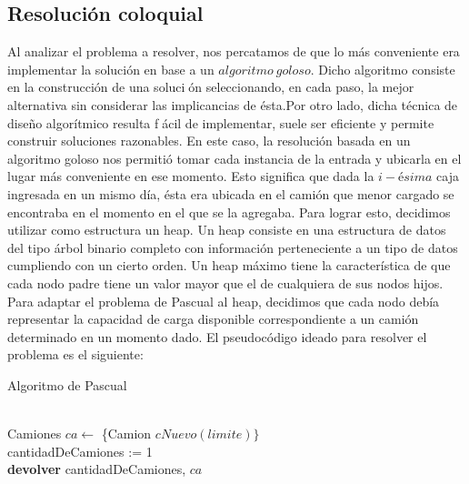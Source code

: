 \subsection{Resolución coloquial}
Al analizar el problema a resolver, nos percatamos de que lo más conveniente era implementar la solución en base a un $algoritmo\ goloso$. Dicho algoritmo consiste en la construcción de una solución seleccionando, en cada paso, la mejor alternativa sin considerar las implicancias de ésta.\newline Por otro lado, dicha técnica de diseño algorítmico resulta fácil de implementar, suele ser eficiente y permite construir soluciones razonables.\newline
\newline
En este caso, la resolución basada en un algoritmo goloso nos permitió tomar cada instancia de la entrada y ubicarla en el lugar más conveniente en ese momento. Esto significa que dada la $i-ésima$ caja ingresada en un mismo día, ésta era ubicada en el camión que menor cargado se encontraba en el momento en el que se la agregaba. Para lograr esto, decidimos utilizar como estructura un heap.\newline
\newline
Un heap consiste en una estructura de datos del tipo árbol binario completo con información perteneciente a un tipo de datos cumpliendo con un cierto orden. Un heap máximo tiene la característica de que cada nodo padre tiene un valor mayor que el de cualquiera de sus nodos hijos.\newline
Para adaptar el problema de Pascual al heap, decidimos que cada nodo debía representar la capacidad de carga disponible correspondiente a un camión determinado en un momento dado.\newline
\newline
El pseudocódigo ideado para resolver el problema es el siguiente:\newline

\begin{algorithm}[H]
	\SetAlgoLined
	\caption{Algoritmo de Pascual}
	\\
	
	Camiones $ca \leftarrow$ \{Camion $cNuevo(limite)\}$\\
	cantidadDeCamiones := 1\\
	\textbf{devolver} cantidadDeCamiones, $ca$
\end{algorithm}

